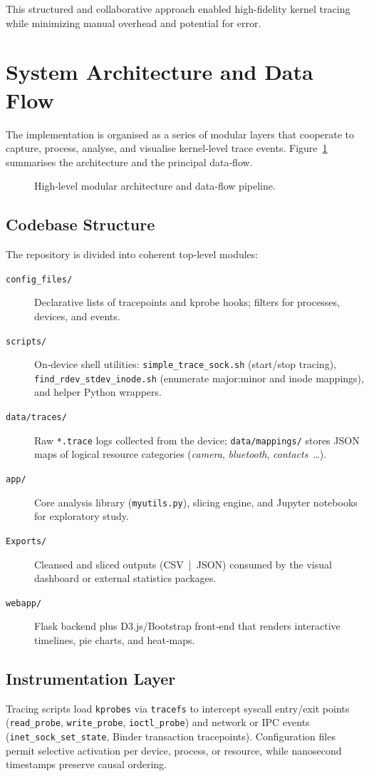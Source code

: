 \documentclass[a4paper,12pt]{report}
\begin{document}
This structured and collaborative approach enabled high-fidelity kernel tracing while minimizing manual overhead and potential for error.
\section{System Architecture and Data Flow}
The implementation is organised as a series of modular layers that cooperate to capture, process, analyse, and visualise kernel‑level trace events. Figure~\ref{fig:architecture}  summarises the architecture and the principal data‑flow.

\begin{figure}[ht]
\centering

\caption{High‑level modular architecture and data‑flow pipeline.}
\label{fig:architecture}
\end{figure}

\subsection{Codebase Structure}
The repository is divided into coherent top‑level modules:
\begin{description}
\item[\texttt{config\_files/}] Declarative lists of tracepoints and kprobe hooks; filters for processes, devices, and events.
\item[\texttt{scripts/}] On‑device shell utilities: \texttt{simple\_trace\_sock.sh} (start/stop tracing), \texttt{find\_rdev\_stdev\_inode.sh} (enumerate major:minor and inode mappings), and helper Python wrappers.
\item[\texttt{data/traces/}] Raw \texttt{*.trace} logs collected from the device; \texttt{data/mappings/} stores JSON maps of logical resource categories (\emph{camera}, \emph{bluetooth}, \emph{contacts} \ldots).
\item[\texttt{app/}] Core analysis library (\texttt{myutils.py}), slicing engine, and Jupyter notebooks for exploratory study.
\item[\texttt{Exports/}] Cleansed and sliced outputs (CSV | JSON) consumed by the visual dashboard or external statistics packages.
\item[\texttt{webapp/}] Flask backend plus D3.js/Bootstrap front‑end that renders interactive timelines, pie charts, and heat‑maps.
\end{description}

\subsection{Instrumentation Layer}
Tracing scripts load \texttt{kprobes} via \texttt{tracefs} to intercept syscall entry/exit points (\texttt{read\_probe}, \texttt{write\_probe}, \texttt{ioctl\_probe}) and network or IPC events (\texttt{inet\_sock\_set\_state}, Binder transaction tracepoints). Configuration files permit selective activation per device, process, or resource, while nanosecond timestamps preserve causal ordering.
\end{document}
